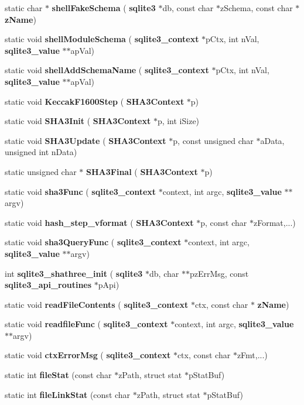 \begin{DoxyCompactItemize}
static char $\ast$ \textbf{ shell\+Fake\+Schema} (\textbf{ sqlite3} $\ast$db, const char $\ast$z\+Schema, const char $\ast$\textbf{ z\+Name})
\item 
static void \textbf{ shell\+Module\+Schema} (\textbf{ sqlite3\+\_\+context} $\ast$p\+Ctx, int n\+Val, \textbf{ sqlite3\+\_\+value} $\ast$$\ast$ap\+Val)
\item 
static void \textbf{ shell\+Add\+Schema\+Name} (\textbf{ sqlite3\+\_\+context} $\ast$p\+Ctx, int n\+Val, \textbf{ sqlite3\+\_\+value} $\ast$$\ast$ap\+Val)
\item 
static void \textbf{ Keccak\+F1600\+Step} (\textbf{ S\+H\+A3\+Context} $\ast$p)
\item 
static void \textbf{ S\+H\+A3\+Init} (\textbf{ S\+H\+A3\+Context} $\ast$p, int i\+Size)
\item 
static void \textbf{ S\+H\+A3\+Update} (\textbf{ S\+H\+A3\+Context} $\ast$p, const unsigned char $\ast$a\+Data, unsigned int n\+Data)
\item 
static unsigned char $\ast$ \textbf{ S\+H\+A3\+Final} (\textbf{ S\+H\+A3\+Context} $\ast$p)
\item 
static void \textbf{ sha3\+Func} (\textbf{ sqlite3\+\_\+context} $\ast$context, int argc, \textbf{ sqlite3\+\_\+value} $\ast$$\ast$argv)
\item 
static void \textbf{ hash\+\_\+step\+\_\+vformat} (\textbf{ S\+H\+A3\+Context} $\ast$p, const char $\ast$z\+Format,...)
\item 
static void \textbf{ sha3\+Query\+Func} (\textbf{ sqlite3\+\_\+context} $\ast$context, int argc, \textbf{ sqlite3\+\_\+value} $\ast$$\ast$argv)
\item 
int \textbf{ sqlite3\+\_\+shathree\+\_\+init} (\textbf{ sqlite3} $\ast$db, char $\ast$$\ast$pz\+Err\+Msg, const \textbf{ sqlite3\+\_\+api\+\_\+routines} $\ast$p\+Api)
\item 
static void \textbf{ read\+File\+Contents} (\textbf{ sqlite3\+\_\+context} $\ast$ctx, const char $\ast$\textbf{ z\+Name})
\item 
static void \textbf{ readfile\+Func} (\textbf{ sqlite3\+\_\+context} $\ast$context, int argc, \textbf{ sqlite3\+\_\+value} $\ast$$\ast$argv)
\item 
static void \textbf{ ctx\+Error\+Msg} (\textbf{ sqlite3\+\_\+context} $\ast$ctx, const char $\ast$z\+Fmt,...)
\item 
static int \textbf{ file\+Stat} (const char $\ast$z\+Path, struct stat $\ast$p\+Stat\+Buf)
\item 
static int \textbf{ file\+Link\+Stat} (const char $\ast$z\+Path, struct stat $\ast$p\+Stat\+Buf)

\end{DoxyCompactItemize}
